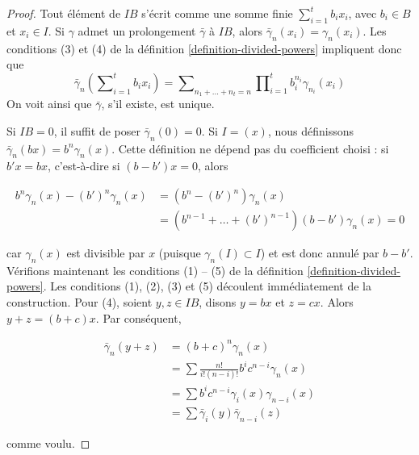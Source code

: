 \begin{proof}
Tout élément de $IB$ s'écrit comme une somme finie $\sum\nolimits_{i=1}^t b_ix_i$, avec $b_i \in B$ et $x_i \in I$. Si $\gamma$ admet un prolongement $\bar\gamma$ à $IB$, alors $\bar\gamma_n(x_i) = \gamma_n(x_i)$. Les conditions (3) et (4) de la définition \ref{definition-divided-powers} impliquent donc que
$$
\bar\gamma_n(\sum\nolimits_{i=1}^t b_ix_i) =
\sum\nolimits_{n_1 + \ldots + n_t = n}
\prod\nolimits_{i = 1}^t b_i^{n_i}\gamma_{n_i}(x_i)
$$
On voit ainsi que $\bar\gamma$, s'il existe, est unique.

\medskip\noindent

Si $IB = 0$, il suffit de poser $\bar\gamma_n(0) = 0$. Si $I = (x)$,
nous définissons $\bar\gamma_n(bx) = b^n\gamma_n(x)$. Cette définition ne dépend pas du coefficient choisi : si $b'x = bx$, c'est-à-dire si $(b - b')x = 0$, alors

\begin{align*}
b^n\gamma_n(x) - (b')^n\gamma_n(x)
& =
(b^n - (b')^n)\gamma_n(x) \\
& =
(b^{n - 1} + \ldots + (b')^{n - 1})(b - b')\gamma_n(x) = 0
\end{align*}

car $\gamma_n(x)$ est divisible par $x$ (puisque
$\gamma_n(I) \subset I$) et est donc annulé par $b - b'$. Vérifions maintenant les conditions (1) -- (5) de la définition \ref{definition-divided-powers}. Les conditions (1), (2), (3) et (5) découlent immédiatement de la construction. Pour (4), soient $y, z \in IB$, disons $y = bx$ et $z = cx$. Alors
$y + z = (b + c)x$. Par conséquent,

\begin{align*}
\bar\gamma_n(y + z)
& =
(b + c)^n\gamma_n(x) \\
& =
\sum \frac{n!}{i!(n - i)!}b^ic^{n -i}\gamma_n(x) \\
& =
\sum b^ic^{n - i}\gamma_i(x)\gamma_{n - i}(x) \\
& =
\sum \bar\gamma_i(y)\bar\gamma_{n -i}(z)
\end{align*}

comme voulu.

\medskip\noindent


\end{proof}
